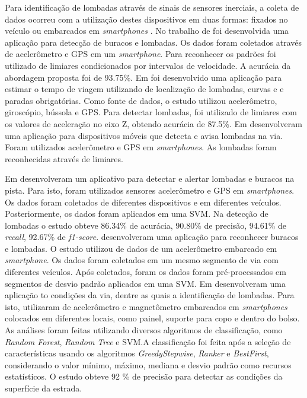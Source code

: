 Para identificação de lombadas através de sinais de sensores inerciais, a coleta de dados ocorreu com a utilização destes dispositivos em duas formas: fixados no veículo \cite{Sabir2019,Padilla2018} ou embarcados em \textit{smartphones} \cite{Fouad2014,Alam2020,Rishiwal2016,Wang2018,Verma2016,Souza2018,Edwan2019,Savera2016,Idris2019,Dey2019,Aljaafreh2017,Aragon2016}. No trabalho de \cite{Rishiwal2016} foi desenvolvida uma aplicação para detecção de buracos e lombadas. Os dados foram coletados através de acelerômetro e GPS em um \textit{smartphone}. Para reconhecer os padrões foi utilizado de limiares condicionados por intervalos de velocidade. A acurácia da abordagem proposta foi de 93.75\%. Em \cite{Verma2016} foi desenvolvido uma aplicação para estimar o tempo de viagem utilizando de localização de lombadas, curvas e e paradas obrigatórias. Como fonte de dados, o estudo utilizou acelerômetro, giroscópio, bússola e GPS. Para detectar lombadas, foi utilizado de limiares com os valores de aceleração no eixo Z, obtendo acurácia de 87.5\%. Em \cite{Edwan2019} desenvolveram uma aplicação para dispositivos móveis que detecta e avisa lombadas na via. Foram utilizados acelerômetro e GPS em \textit{smartphones}. As lombadas foram reconhecidas através de limiares.

Em \cite{Savera2016} desenvolveram um aplicativo para detectar e alertar lombadas e buracos na pista. Para isto, foram utilizados sensores acelerômetro e GPS em \textit{smartphones}. Os dados foram coletados de diferentes dispositivos e em diferentes veículos. Posteriormente, os dados foram aplicados em uma SVM. Na detecção de lombadas o estudo obteve 86.34\% de acurácia, 90.80\% de precisão, 94.61\% de \textit{recall}, 92.67\% de \textit{f1-score}. \cite{Idris2019} desenvolveram uma aplicação para reconhecer buracos e lombadas. O estudo utilizou de dados de um acelerômetro embarcado em \textit{smartphone}. Os dados foram coletados em um mesmo segmento de via com diferentes veículos. Após coletados, foram os dados foram pré-processados em segmentos de desvio padrão aplicados em uma SVM. Em \cite{Dey2019} desenvolveram uma aplicação to condições da via, dentre as quais a identificação de lombadas. Para isto, utilizaram de acelerômetro e magnetômetro embarcados em \textit{smartphones} colocados em diferentes locais, como painel, suporte para copo e dentro do bolso. As análises foram feitas utilizando diversos algoritmos de classificação, como \textit{Random Forest}, \textit{Random Tree} e SVM.A classificação foi feita após a seleção de características usando os algoritmos \textit{GreedyStepwise}, \textit{Ranker} e \textit{BestFirst}, considerando o valor mínimo, máximo, mediana e desvio padrão como recursos estatísticos. O estudo obteve 92 \% de precisão para detectar as condições da superfície da estrada.

